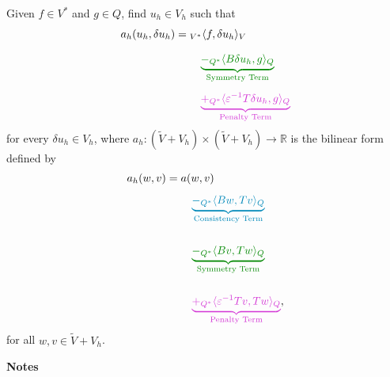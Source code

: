\documentclass[11pt,a4paper]{article}
\begin{document}
Given $f\in V^*$ and $g\in Q$, find $u_h\in V_h$ such that
\begin{align*}
a_h(u_h,\delta u_h)
={}&{}_{V^*}\langle f,\delta u_h\rangle_V\\[0.75em]
&\quad
\textcolor{NitscheGreen}{
\underbrace{
-{}_{Q^*}\langle B\delta u_h,g\rangle_Q
}_{\text{Symmetry Term}}}\\[0.5em]
&\quad
\textcolor{NitscheMagenta}{
\underbrace{
+{}_{Q^*}\langle\varepsilon^{-1}T\delta u_h,g\rangle_Q
}_{\text{Penalty Term}}}
\end{align*}
for every $\delta u_h\in V_h$, where
$a_h:(\widetilde V+V_h)\times(\widetilde V+V_h)\to\mathbb R$
is the bilinear form defined by
\begin{align*}
a_h(w,v)
={}&a(w,v)\\[0.5em]
&\quad
\textcolor{NitscheBlue}{
\underbrace{
-{}_{Q^*}\langle Bw,Tv\rangle_Q
}_{\text{Consistency Term}}}\\[1.5em]
&\quad
\textcolor{NitscheGreen}{
\underbrace{
-{}_{Q^*}\langle Bv,Tw\rangle_Q
}_{\text{Symmetry Term}}}\\[1.5em]
&\quad
\textcolor{NitscheMagenta}{
\underbrace{
+{}_{Q^*}\langle\varepsilon^{-1}Tv,Tw\rangle_Q
}_{\text{Penalty Term}}},
\end{align*}
for all $w,v\in\widetilde V+V_h$.

\newpage

\textbf{Notes}
\end{document}

